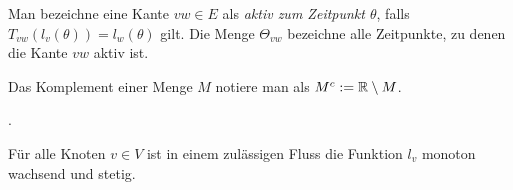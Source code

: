 \begin{definition}
	Man bezeichne eine Kante $vw\in E$ als \emph{aktiv zum Zeitpunkt $\theta$}, falls $T_{vw}(l_v(\theta)) = l_w(\theta)$ gilt.
	Die Menge $\Theta_{vw}$ bezeichne alle Zeitpunkte, zu denen die Kante $vw$ aktiv ist.
\end{definition}
\begin{notation}
	Das Komplement einer Menge $M$ notiere man als $M^c:= \mathbb{R}\setminus M$.
\end{notation}

.

\begin{lemma}
	Für alle Knoten $v\in V$ ist in einem zulässigen Fluss die Funktion $l_v$ monoton wachsend und stetig.
\end{lemma}
